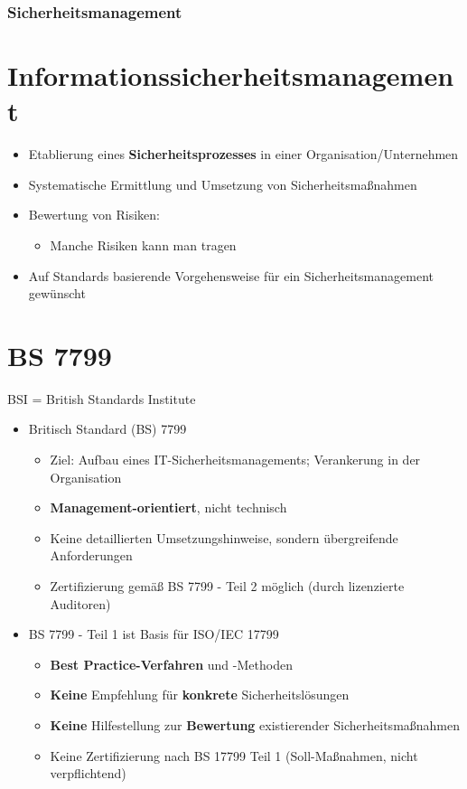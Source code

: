 \documentclass[openany]{book}
\begin{document}
\subsubsection{Sicherheitsmanagement}

\section{Informationssicherheitsmanagement}

\begin{itemize}
    \item Etablierung eines \textbf{Sicherheitsprozesses} in einer Organisation/Unternehmen
    \item Systematische Ermittlung und Umsetzung von Sicherheitsmaßnahmen
    \item Bewertung von Risiken:
    \begin{itemize}
        \item Manche Risiken kann man tragen
    \end{itemize}
    \item Auf Standards basierende Vorgehensweise für ein Sicherheitsmanagement gewünscht
\end{itemize}

\section{BS 7799}

BSI = British Standards Institute

\begin{itemize}
    \item Britisch Standard (BS) 7799
    \begin{itemize}
        \item Ziel: Aufbau eines IT-Sicherheitsmanagements; Verankerung in der Organisation
        \item \textbf{Management-orientiert}, nicht technisch
        \item Keine detaillierten Umsetzungshinweise, sondern übergreifende Anforderungen
        \item Zertifizierung gemäß BS 7799 - Teil 2 möglich (durch lizenzierte Auditoren)
    \end{itemize}
    \item BS 7799 - Teil 1 ist Basis für ISO/IEC 17799
    \begin{itemize}
        \item \textbf{Best Practice-Verfahren} und -Methoden
        \item \textbf{Keine} Empfehlung für \textbf{konkrete} Sicherheitslösungen
        \item \textbf{Keine} Hilfestellung zur \textbf{Bewertung} existierender Sicherheitsmaßnahmen
        \item Keine Zertifizierung nach BS 17799 Teil 1 (Soll-Maßnahmen, nicht verpflichtend)
    \end{itemize}
\end{itemize}
\end{document}
